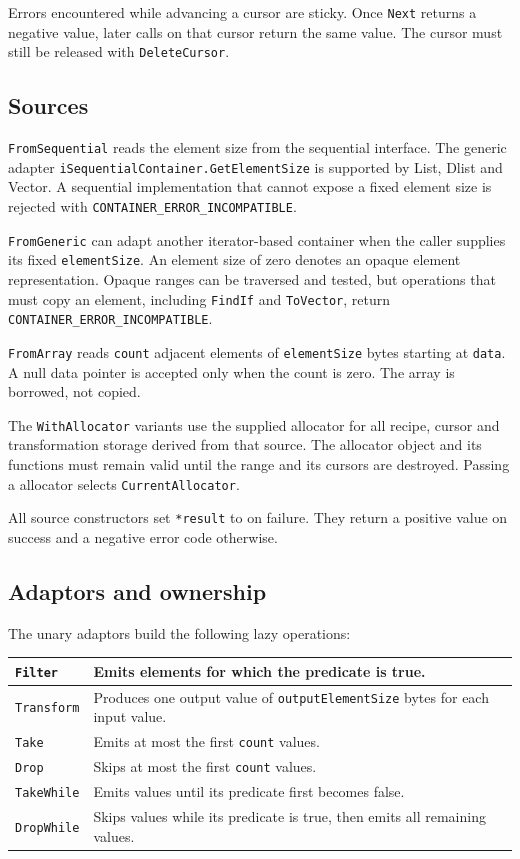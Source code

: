Errors encountered while advancing a cursor are sticky.  Once \verb|Next|
returns a negative value, later calls on that cursor return the same value.
The cursor must still be released with \verb|DeleteCursor|.

\subsection{Sources}

\verb|FromSequential| reads the element size from the sequential interface.
The generic adapter \verb|iSequentialContainer.GetElementSize| is supported
by List, Dlist and Vector.  A sequential implementation that cannot expose a
fixed element size is rejected with \verb|CONTAINER_ERROR_INCOMPATIBLE|.

\verb|FromGeneric| can adapt another iterator-based container when the caller
supplies its fixed \verb|elementSize|.  An element size of zero denotes an
opaque element representation.  Opaque ranges can be traversed and tested,
but operations that must copy an element, including \verb|FindIf| and
\verb|ToVector|, return \verb|CONTAINER_ERROR_INCOMPATIBLE|.

\verb|FromArray| reads \verb|count| adjacent elements of \verb|elementSize|
bytes starting at \verb|data|.  A null data pointer is accepted only when the
count is zero.  The array is borrowed, not copied.

The \verb|WithAllocator| variants use the supplied allocator for all recipe,
cursor and transformation storage derived from that source.  The allocator
object and its functions must remain valid until the range and its cursors are
destroyed.  Passing a \Null allocator selects \verb|CurrentAllocator|.

All source constructors set \verb|*result| to \Null on failure.  They return
a positive value on success and a negative error code otherwise.

\subsection{Adaptors and ownership}

The unary adaptors build the following lazy operations:

\begin{center}
\begin{tabular}{|l|p{10.2cm}|}
\hline
\verb|Filter| & Emits elements for which the predicate is true. \\\hline
\verb|Transform| & Produces one output value of
\verb|outputElementSize| bytes for each input value. \\\hline
\verb|Take| & Emits at most the first \verb|count| values. \\\hline
\verb|Drop| & Skips at most the first \verb|count| values. \\\hline
\verb|TakeWhile| & Emits values until its predicate first becomes false. \\\hline
\verb|DropWhile| & Skips values while its predicate is true, then emits all
remaining values. \\\hline
\end{tabular}
\end{center}

